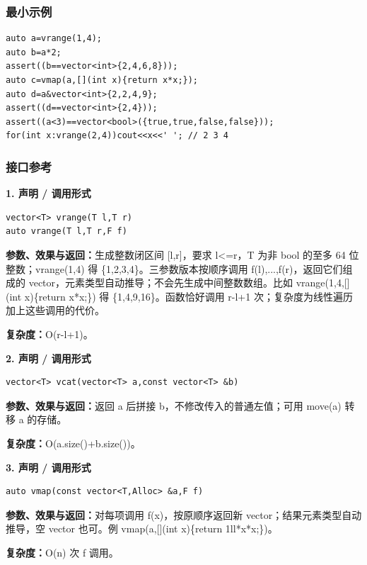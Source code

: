 \documentclass[UTF8,a4paper,10pt]{ctexart}
\begin{document}
\subsubsection*{最小示例}
\begin{lstlisting}
auto a=vrange(1,4);
auto b=a*2;
assert((b==vector<int>{2,4,6,8}));
auto c=vmap(a,[](int x){return x*x;});
auto d=a&vector<int>{2,2,4,9};
assert((d==vector<int>{2,4}));
assert((a<3)==vector<bool>({true,true,false,false}));
for(int x:vrange(2,4))cout<<x<<' '; // 2 3 4
\end{lstlisting}
\subsubsection*{接口参考}
\noindent\begin{minipage}{\textwidth}
\textbf{1. 声明 / 调用形式}
\begin{lstlisting}
vector<T> vrange(T l,T r)
auto vrange(T l,T r,F f)
\end{lstlisting}
\textbf{参数、效果与返回：}生成整数闭区间 [l,r]，要求 l<=r，T 为非 bool 的至多 64 位整数；vrange(1,4) 得 \{1,2,3,4\}。三参数版本按顺序调用 f(l),...,f(r)，返回它们组成的 vector，元素类型自动推导；不会先生成中间整数数组。比如 vrange(1,4,[](int x)\{return x*x;\}) 得 \{1,4,9,16\}。函数恰好调用 r-l+1 次；复杂度为线性遍历加上这些调用的代价。

\textbf{复杂度：}O(r-l+1)。

\end{minipage}\par\vspace{0.4em}
\noindent\begin{minipage}{\textwidth}
\textbf{2. 声明 / 调用形式}
\begin{lstlisting}
vector<T> vcat(vector<T> a,const vector<T> &b)
\end{lstlisting}
\textbf{参数、效果与返回：}返回 a 后拼接 b，不修改传入的普通左值；可用 move(a) 转移 a 的存储。

\textbf{复杂度：}O(a.size()+b.size())。

\end{minipage}\par\vspace{0.4em}
\noindent\begin{minipage}{\textwidth}
\textbf{3. 声明 / 调用形式}
\begin{lstlisting}
auto vmap(const vector<T,Alloc> &a,F f)
\end{lstlisting}
\textbf{参数、效果与返回：}对每项调用 f(x)，按原顺序返回新 vector；结果元素类型自动推导，空 vector 也可。例 vmap(a,[](int x)\{return 1ll*x*x;\})。

\textbf{复杂度：}O(n) 次 f 调用。

\end{minipage}\par\vspace{0.4em}
\end{document}
